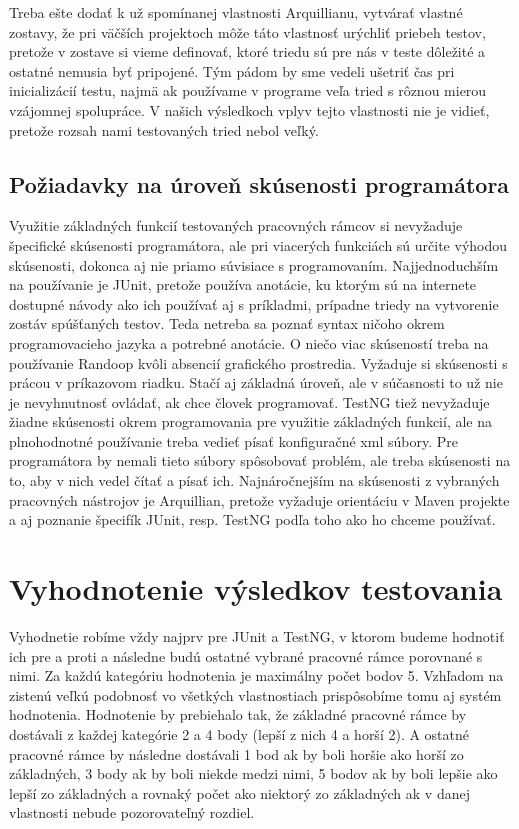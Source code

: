 \documentclass[11pt,twoside,slovak,a4paper]{article}
\begin{document}
	Treba ešte dodať k už spomínanej vlastnosti Arquillianu, vytvárať vlastné zostavy, že pri väčších projektoch môže táto vlastnosť urýchliť priebeh testov, pretože v zostave si vieme definovať, ktoré triedu sú pre nás v teste dôležité a ostatné nemusia byť pripojené. Tým pádom by sme vedeli ušetriť čas pri inicializácií testu, najmä ak používame v programe veľa tried s rôznou mierou vzájomnej spolupráce. V našich výsledkoch vplyv tejto vlastnosti nie je vidieť, pretože rozsah nami testovaných tried nebol veľký.
	
	\subsection{Požiadavky na úroveň skúsenosti programátora}
	Využitie základných funkcií testovaných pracovných rámcov si nevyžaduje špecifické skúsenosti programátora, ale pri viacerých funkciách sú určite výhodou skúsenosti, dokonca aj nie priamo súvisiace s programovaním. Najjednoduchším na používanie je JUnit, pretože používa anotácie, ku ktorým sú na internete dostupné návody ako ich používať aj s príkladmi, prípadne triedy na vytvorenie zostáv spúšťaných testov. Teda netreba sa poznať syntax ničoho okrem programovacieho jazyka a potrebné anotácie. O niečo viac skúseností treba na používanie Randoop kvôli absencií grafického prostredia. Vyžaduje si skúsenosti s prácou v príkazovom riadku. Stačí aj základná úroveň, ale v súčasnosti to už nie je nevyhnutnosť ovládať, ak chce človek programovať. TestNG tiež nevyžaduje žiadne skúsenosti okrem programovania pre využitie základných funkcií, ale na plnohodnotné používanie treba vedieť písať konfiguračné xml súbory. Pre programátora by nemali tieto súbory spôsobovať problém, ale treba skúsenosti na to, aby v nich vedel čítať a písať ich. Najnáročnejším na skúsenosti z vybraných pracovných nástrojov je Arquillian, pretože vyžaduje orientáciu v Maven projekte a aj poznanie špecifík JUnit, resp. TestNG podľa toho ako ho chceme používať.
	

	\newpage
	
	\section{Vyhodnotenie výsledkov testovania}
	Vyhodnetie robíme vždy najprv pre JUnit a TestNG, v ktorom budeme hodnotiť ich pre a proti a následne budú ostatné vybrané pracovné rámce porovnané s nimi. Za každú kategóriu hodnotenia je maximálny počet bodov 5. Vzhľadom na zistenú veľkú podobnosť vo všetkých vlastnostiach prispôsobíme tomu aj systém hodnotenia. Hodnotenie by prebiehalo tak, že základné pracovné rámce by dostávali z každej kategórie 2 a 4 body (lepší z nich 4 a horší 2). A ostatné pracovné rámce by následne dostávali 1 bod ak by boli horšie ako horší zo základných, 3 body ak by boli niekde medzi nimi, 5 bodov ak by boli lepšie ako lepší zo základných a rovnaký počet ako niektorý zo základných ak v danej vlastnosti nebude pozorovateľný rozdiel.
	
\end{document}
